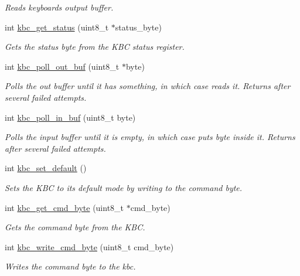 \begin{DoxyCompactItemize}
\begin{DoxyCompactList}\small\item\em Reads keyboard\textquotesingle{}s output buffer. \end{DoxyCompactList}\item 
int \mbox{\hyperlink{group__keyboard_ga54c1dc87fd33a133b8c1eaf08bc51a99}{kbc\+\_\+get\+\_\+status}} (uint8\+\_\+t $\ast$status\+\_\+byte)
\begin{DoxyCompactList}\small\item\em Gets the status byte from the K\+BC status register. \end{DoxyCompactList}\item 
int \mbox{\hyperlink{group__keyboard_ga203a4c111fbe4b4fe6946a77bebbc171}{kbc\+\_\+poll\+\_\+out\+\_\+buf}} (uint8\+\_\+t $\ast$byte)
\begin{DoxyCompactList}\small\item\em Polls the out buffer until it has something, in which case reads it. Returns after several failed attempts. \end{DoxyCompactList}\item 
int \mbox{\hyperlink{group__keyboard_ga26b9ea576b6e214c7748979568e97c7c}{kbc\+\_\+poll\+\_\+in\+\_\+buf}} (uint8\+\_\+t byte)
\begin{DoxyCompactList}\small\item\em Polls the input buffer until it is empty, in which case puts byte inside it. Returns after several failed attempts. \end{DoxyCompactList}\item 
int \mbox{\hyperlink{group__keyboard_gabed7ca5d360dbf3737554bd242d48fc1}{kbc\+\_\+set\+\_\+default}} ()
\begin{DoxyCompactList}\small\item\em Sets the K\+BC to its default mode by writing to the command byte. \end{DoxyCompactList}\item 
int \mbox{\hyperlink{group__keyboard_ga3ab732a7b5d332ab6af5f82456c3528a}{kbc\+\_\+get\+\_\+cmd\+\_\+byte}} (uint8\+\_\+t $\ast$cmd\+\_\+byte)
\begin{DoxyCompactList}\small\item\em Gets the command byte from the K\+BC. \end{DoxyCompactList}\item 
int \mbox{\hyperlink{group__keyboard_gab18be1772193037a82088027884ef917}{kbc\+\_\+write\+\_\+cmd\+\_\+byte}} (uint8\+\_\+t cmd\+\_\+byte)
\begin{DoxyCompactList}\small\item\em Writes the command byte to the kbc. \end{DoxyCompactList}\item 

\end{DoxyCompactItemize}
